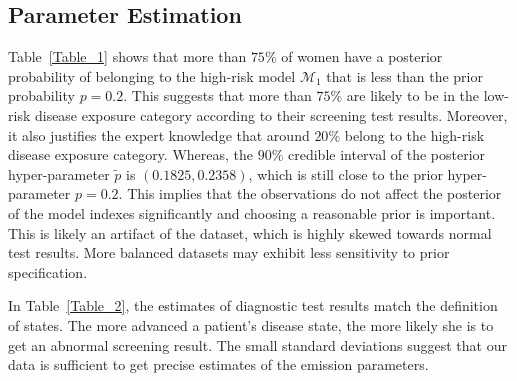 \documentclass{article}
\begin{document}
\subsection{Parameter Estimation} \label{sec:pars}
Table~\ref{Table_1} shows that more than $75\%$ of women have a posterior probability of belonging to the high-risk model $\mathcal{M}_1$ that is less than the prior probability $p = 0.2$. This suggests that more than $75\%$ are likely to be in the low-risk disease exposure category according to their screening test results. Moreover, it also justifies the expert knowledge that around $20\%$  belong to the high-risk disease exposure category. Whereas, the $90\%$ credible interval of the posterior hyper-parameter $\tilde{p}$ is $(0.1825, 0.2358)$, which is still close to the prior hyper-parameter $p = 0.2$. 
This implies that the observations do not affect the posterior of the model indexes significantly and choosing a reasonable prior is important.  This is likely an artifact of the dataset, which is highly skewed towards normal test results.  More balanced datasets may exhibit less sensitivity to prior specification. 

\begin{table}[ht!]
	\centering
	\caption{Maximum likelihood estimates of quantiles of the posterior probability for Model 1.}
	\label{Table_1}
\end{table}


In Table~\ref{Table_2}, the estimates of diagnostic test results match the definition of states. The more advanced a patient's disease state, the more likely she is to get an abnormal screening result. The small standard deviations suggest that our data is sufficient to get precise estimates of the emission parameters. 
\end{document}
